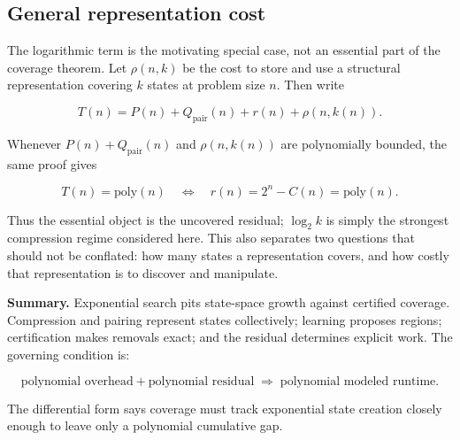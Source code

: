 \documentclass[
  10pt,
  english,
]{article}
\begin{document}
\hypertarget{general-representation-cost}{%
\subsection{General representation
cost}\label{general-representation-cost}}

The logarithmic term is the motivating special case, not an essential
part of the coverage theorem. Let \(\rho(n,k)\) be the cost to store and
use a structural representation covering \(k\) states at problem size
\(n\). Then write

\[
T(n) = P(n) + Q_{\mathrm{pair}}(n) + r(n) + \rho(n,k(n)).
\]

Whenever \(P(n)+Q_{\mathrm{pair}}(n)\) and \(\rho(n,k(n))\) are
polynomially bounded, the same proof gives

\[
T(n) = \mathrm{poly}(n) \quad\Longleftrightarrow\quad r(n) = 2^n - C(n) = \mathrm{poly}(n).
\]

Thus the essential object is the uncovered residual; \(\log_2 k\) is
simply the strongest compression regime considered here. This also
separates two questions that should not be conflated: how many states a
representation covers, and how costly that representation is to discover
and manipulate.

\begin{tcolorbox}[accentbox]
\textbf{Summary.} Exponential search pits state-space growth against
certified coverage. Compression and pairing represent states collectively;
learning proposes regions; certification makes removals exact; and the
residual determines explicit work. The governing condition is:

\[
  \text{polynomial overhead} + \text{polynomial residual} \;\Longrightarrow\; \text{polynomial modeled runtime.}
  \]

The differential form says coverage must track exponential state creation
closely enough to leave only a polynomial cumulative gap.
\end{tcolorbox}
\end{document}
